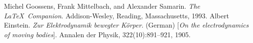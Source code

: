 \documentclass[a4paper,12pt]{article}
\begin{document}
\begin{thebibliography}{99}
%
Michel Goossens, Frank Mittelbach, and Alexander Samarin. 
\textit{The \LaTeX\ Companion}. 
Addison-Wesley, Reading, Massachusetts, 1993.
%
Albert Einstein. 
\textit{Zur Elektrodynamik bewegter K{\"o}rper}. (German) 
[\textit{On the electrodynamics of moving bodies}]. 
Annalen der Physik, 322(10):891–921, 1905.
%
\end{thebibliography}
\end{document}
